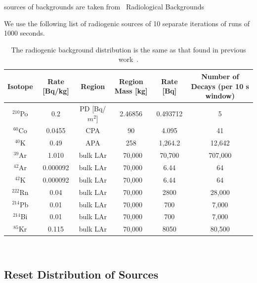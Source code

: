 sources of backgrounds are taken from~\citep{DUNE-FD_TDRv4:Abi_2020}
Radiological Backgrounds~\citep{ar39_backgrounds, phd_backgrounds}

We use the following list of radiogenic sources of 10 separate iterations of runs of 1000 seconds.

\begin{table}
\begin{center}
\begin{tabular}{|c c c c c c|}
 \hline
 Isotope & Rate [Bq/kg] & Region & Region Mass [kg] & Rate [Bq] & Number of Decays (per 10 s window) \\ [0.5ex]
 \hline\hline
  $^{210}$Po & 0.2 & PD [Bq/$m^2$] & 2.46856 & 0.493712 & 5 \\
  $^{60}$Co & 0.0455 & CPA & 90 & 4.095 & 41 \\
  $^{40}$K & 0.49 & APA & 258 & 1,264.2 & 12,642 \\
  $^{39}$Ar & 1.010 & bulk LAr & ~70,000 & 70,700 & 707,000 \\
  $^{42}$Ar & 0.000092 & bulk LAr & ~70,000 & 6.44 & 64 \\
  $^{42}$K  & 0.000092 & bulk LAr & ~70,000 & 6.44 & 64 \\
  $^{222}$Rn & 0.04 & bulk LAr & ~70,000 & 2800 & 28,000 \\
  $^{214}$Pb & 0.01 & bulk LAr & ~70,000 & 700 & 7,000 \\
  $^{214}$Bi & 0.01 & bulk LAr & ~70,000 & 700 & 7,000 \\
  $^{85}$Kr & 0.115 & bulk LAr & ~70,000 & 8050 & 80,500 \\
 \hline
\end{tabular}
\caption{The radiogenic background distribution is the same as that found in previous work~\citep{qpix:shion}.}
\end{center}
\end{table}
~\label{table:radiogenic_backgrounds}


\subsection{Reset Distribution of Sources}



